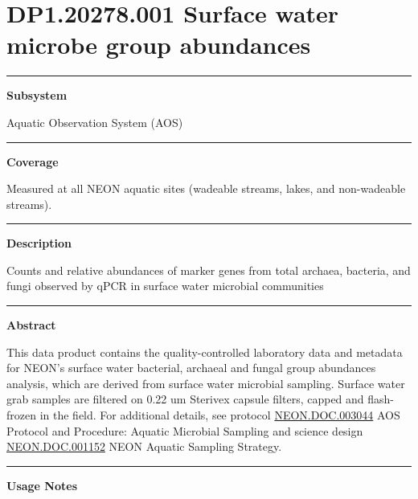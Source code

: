 \documentclass[]{article}
\begin{document}
\section{DP1.20278.001 Surface water microbe group
abundances}\label{dp1.20278.001-surface-water-microbe-group-abundances}

\begin{center}\rule{0.5\linewidth}{\linethickness}\end{center}

\textbf{Subsystem}

Aquatic Observation System (AOS)

\begin{center}\rule{0.5\linewidth}{\linethickness}\end{center}

\textbf{Coverage}

Measured at all NEON aquatic sites (wadeable streams, lakes, and
non-wadeable streams).

\begin{center}\rule{0.5\linewidth}{\linethickness}\end{center}

\textbf{Description}

Counts and relative abundances of marker genes from total archaea,
bacteria, and fungi observed by qPCR in surface water microbial
communities

\begin{center}\rule{0.5\linewidth}{\linethickness}\end{center}

\textbf{Abstract}

This data product contains the quality-controlled laboratory data and
metadata for NEON's surface water bacterial, archaeal and fungal group
abundances analysis, which are derived from surface water microbial
sampling. Surface water grab samples are filtered on 0.22 um Sterivex
capsule filters, capped and flash-frozen in the field. For additional
details, see protocol
\href{http://data.neonscience.org/api/v0/documents/NEON.DOC.003044vB}{NEON.DOC.003044}
AOS Protocol and Procedure: Aquatic Microbial Sampling and science
design
\href{http://data.neonscience.org/api/v0/documents/NEON.DOC.001152vA}{NEON.DOC.001152}
NEON Aquatic Sampling Strategy.

\begin{center}\rule{0.5\linewidth}{\linethickness}\end{center}

\textbf{Usage Notes}
\end{document}
